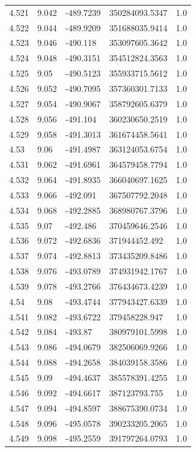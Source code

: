 \begin{tabular}{lllll}
4.521 & 9.042 & -489.7239 & 350284093.5347 & 1.0 \\
4.522 & 9.044 & -489.9209 & 351688035.9414 & 1.0 \\
4.523 & 9.046 & -490.118 & 353097605.3642 & 1.0 \\
4.524 & 9.048 & -490.3151 & 354512824.3563 & 1.0 \\
4.525 & 9.05 & -490.5123 & 355933715.5612 & 1.0 \\
4.526 & 9.052 & -490.7095 & 357360301.7133 & 1.0 \\
4.527 & 9.054 & -490.9067 & 358792605.6379 & 1.0 \\
4.528 & 9.056 & -491.104 & 360230650.2519 & 1.0 \\
4.529 & 9.058 & -491.3013 & 361674458.5641 & 1.0 \\
4.53 & 9.06 & -491.4987 & 363124053.6754 & 1.0 \\
4.531 & 9.062 & -491.6961 & 364579458.7794 & 1.0 \\
4.532 & 9.064 & -491.8935 & 366040697.1625 & 1.0 \\
4.533 & 9.066 & -492.091 & 367507792.2048 & 1.0 \\
4.534 & 9.068 & -492.2885 & 368980767.3796 & 1.0 \\
4.535 & 9.07 & -492.486 & 370459646.2546 & 1.0 \\
4.536 & 9.072 & -492.6836 & 371944452.492 & 1.0 \\
4.537 & 9.074 & -492.8813 & 373435209.8486 & 1.0 \\
4.538 & 9.076 & -493.0789 & 374931942.1767 & 1.0 \\
4.539 & 9.078 & -493.2766 & 376434673.4239 & 1.0 \\
4.54 & 9.08 & -493.4744 & 377943427.6339 & 1.0 \\
4.541 & 9.082 & -493.6722 & 379458228.947 & 1.0 \\
4.542 & 9.084 & -493.87 & 380979101.5998 & 1.0 \\
4.543 & 9.086 & -494.0679 & 382506069.9266 & 1.0 \\
4.544 & 9.088 & -494.2658 & 384039158.3586 & 1.0 \\
4.545 & 9.09 & -494.4637 & 385578391.4255 & 1.0 \\
4.546 & 9.092 & -494.6617 & 387123793.755 & 1.0 \\
4.547 & 9.094 & -494.8597 & 388675390.0734 & 1.0 \\
4.548 & 9.096 & -495.0578 & 390233205.2065 & 1.0 \\
4.549 & 9.098 & -495.2559 & 391797264.0793 & 1.0 \\

\end{tabular}
